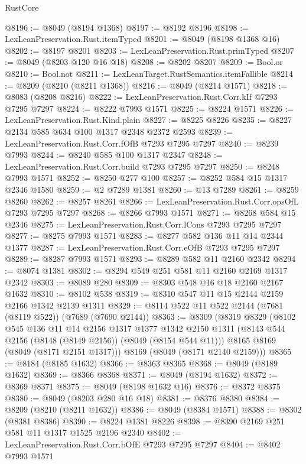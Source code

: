 \begin{lexlean}{RustCore}
\begin{coremodule}
@8196 := @8049 (@8194 @1368)
@8197 := @8192 @8196
@8198 := LexLeanPreservation.Rust.itemTyped
@8201 := @8049 (@8198 @1368 @16)
@8202 := @8197 @8201
@8203 := LexLeanPreservation.Rust.primTyped
@8207 := @8049 (@8203 @120 @16 @18)
@8208 := @8202 @8207
@8209 := Bool.or
@8210 := Bool.not
@8211 := LexLeanTarget.RustSemantics.itemFallible
@8214 := @8209 (@8210 (@8211 @1368))
@8216 := @8049 (@8214 @1571)
@8218 := @8083 (@8208 @8216)
@8222 := LexLeanPreservation.Rust.Corr.kIf @7293 @7295 @7297
@8224 := @8222 @7993 @1571
@8225 := @8224 @1571
@8226 := LexLeanPreservation.Rust.Kind.plain
@8227 := @8225 @8226
@8235 := @8227 @2134 @585 @634 @100 @1317 @2348 @2372 @2593
@8239 := LexLeanPreservation.Rust.Corr.fOfB @7293 @7295 @7297
@8240 := @8239 @7993
@8244 := @8240 @585 @100 @1317 @2347
@8248 := LexLeanPreservation.Rust.Corr.build @7293 @7295 @7297
@8250 := @8248 @7993 @1571
@8252 := @8250 @277 @100
@8257 := @8252 @584 @15 @1317 @2346 @1580
@8259 := @2 @7289 @1381
@8260 := @13 @7289
@8261 := @8259 @8260
@8262 := @8257 @8261
@8266 := LexLeanPreservation.Rust.Corr.opsOfL @7293 @7295 @7297
@8268 := @8266 @7993 @1571
@8271 := @8268 @584 @15 @2346
@8275 := LexLeanPreservation.Rust.Corr.lCons @7293 @7295 @7297
@8277 := @8275 @7993 @1571
@8283 := @8277 @582 @136 @11 @14 @2344 @1377
@8287 := LexLeanPreservation.Rust.Corr.eOfB @7293 @7295 @7297
@8289 := @8287 @7993 @1571
@8293 := @8289 @582 @11 @2160 @2342
@8294 := @8074 @1381
@8302 := @8294 @549 @251 @581 @11 @2160 @2169 @1317 @2342
@8303 := @8089 @280
@8309 := @8303 @548 @16 @18 @2160 @2167 @1632
@8310 := @8102 @538
@8319 := @8310 @547 @11 @15 @2144 @2159 @2166 @1342 @2139 @1311
@8329 := @8114 @522 @11 @522 @2144 (@7681 (@8119 @522)) (@7689 (@7690 @2144))
@8363 := @8309
    (@8319
      @8329
      (@8102
        @545
        @136
        @11
        @14
        @2156
        @1317
        @1377
        @1342
        @2150
        @1311
        (@8143 @544 @2156 (@8148 (@8149 @2156)) (@8049 (@8154 @544 @11)))
        @8165
        @8169
        (@8049 (@8171 @2151 @1317)))
      @8169
      (@8049 (@8171 @2140 @2159)))
@8365 := @8184 (@8185 @1632)
@8366 := @8363 @8365
@8368 := @8049 (@8189 @1632)
@8369 := @8366 @8368
@8371 := @8049 (@8194 @1632)
@8372 := @8369 @8371
@8375 := @8049 (@8198 @1632 @16)
@8376 := @8372 @8375
@8380 := @8049 (@8203 @280 @16 @18)
@8381 := @8376 @8380
@8384 := @8209 (@8210 (@8211 @1632))
@8386 := @8049 (@8384 @1571)
@8388 := @8302 (@8381 @8386)
@8390 := @8224 @1381 @8226
@8398 := @8390 @2169 @251 @581 @11 @1317 @1525 @2196 @2340
@8402 := LexLeanPreservation.Rust.Corr.bOfE @7293 @7295 @7297
@8404 := @8402 @7993 @1571

\end{coremodule}
\end{lexlean}
